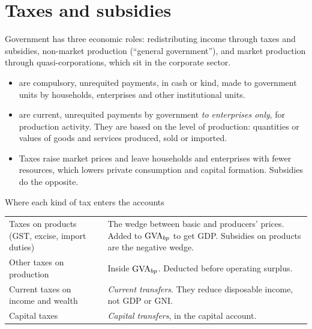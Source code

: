 
\section{Taxes and subsidies}\label{sec:tax}

Government has three economic roles: redistributing income through taxes and subsidies,
non-market production (``general government''), and market production through
quasi-corporations, which sit in the corporate sector.

\begin{itemize}
\item {} are compulsory, unrequited payments, in cash or kind, made to government units
  by households, enterprises and other institutional units.
\item {} are current, unrequited payments by government \emph{to enterprises only},
  for production activity. They are based on the level of production: quantities or values of
  goods and services produced, sold or imported.
\item {} Taxes raise market prices and leave households and enterprises with fewer
  resources, which lowers private consumption and capital formation. Subsidies do the opposite.
\end{itemize}

\begin{keybox}{Where each kind of tax enters the accounts}
\small
\begin{tabularx}{\linewidth}{@{}l X@{}}
Taxes on products (GST, excise, import duties) & The wedge between basic and producers' prices.
Added to $\mathrm{GVA}_{bp}$ to get GDP. Subsidies on products are the negative wedge. \\
Other taxes on production & Inside $\mathrm{GVA}_{bp}$. Deducted before operating surplus. \\
Current taxes on income and wealth & \emph{Current transfers}. They reduce disposable income, not
GDP or GNI. \\
Capital taxes & \emph{Capital transfers}, in the capital account. \\
\end{tabularx}
\end{keybox}

